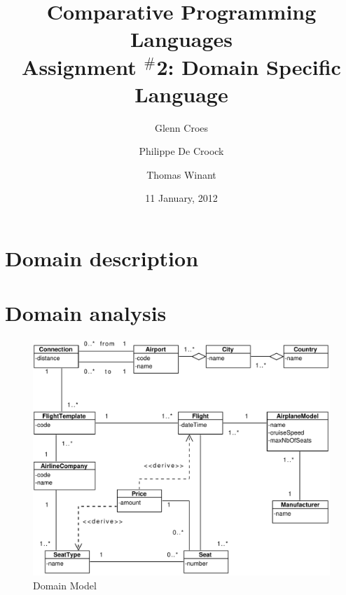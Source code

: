 \documentclass[a4paper]{article}
\begin{document}

\title{Comparative Programming Languages\\
Assignment $^{\#}$2: Domain Specific Language}
\author{Glenn Croes \and Philippe De Croock \and Thomas Winant}
\date{11 January, 2012}

\maketitle

\tableofcontents

\section{Domain description}
\label{sec:domain-description}




\newcommand{\field}[1]{\emph{#1}}

\section{Domain analysis}
\label{sec:domain-analysis}

\begin{figure}[ht!]
  \includegraphics[width=1.0\textwidth]{../analysis/domainModel.pdf}
  \caption{Domain Model}\label{fig:domain-model}
\end{figure}
\end{document}

